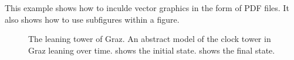 This example shows how to inculde vector graphics in the form of PDF
files. It also shows how to use subfigures within a figure.


\begin{figure}[tbp]
\centering
{}
\hfill
{}

\caption[Abstract Clock Towers]
{
The leaning tower of Graz. An abstract model of the clock
tower in Graz leaning over time.  shows
the initial state.  shows the final state.
}
\label{figWholeFig}
\end{figure}


